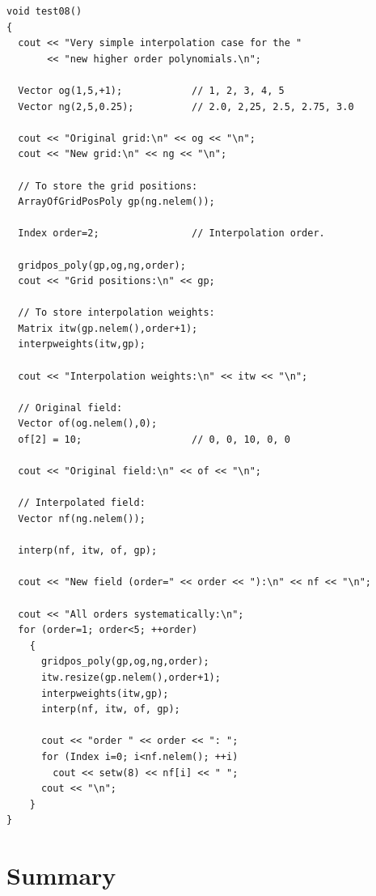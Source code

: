 \begin{lstlisting}
void test08()
{
  cout << "Very simple interpolation case for the "
       << "new higher order polynomials.\n";

  Vector og(1,5,+1);            // 1, 2, 3, 4, 5
  Vector ng(2,5,0.25);          // 2.0, 2,25, 2.5, 2.75, 3.0

  cout << "Original grid:\n" << og << "\n";
  cout << "New grid:\n" << ng << "\n";

  // To store the grid positions:
  ArrayOfGridPosPoly gp(ng.nelem());

  Index order=2;                // Interpolation order.

  gridpos_poly(gp,og,ng,order);
  cout << "Grid positions:\n" << gp;

  // To store interpolation weights:
  Matrix itw(gp.nelem(),order+1);
  interpweights(itw,gp);
    
  cout << "Interpolation weights:\n" << itw << "\n";

  // Original field:
  Vector of(og.nelem(),0);
  of[2] = 10;                   // 0, 0, 10, 0, 0

  cout << "Original field:\n" << of << "\n";

  // Interpolated field:
  Vector nf(ng.nelem());

  interp(nf, itw, of, gp);

  cout << "New field (order=" << order << "):\n" << nf << "\n";  

  cout << "All orders systematically:\n";
  for (order=1; order<5; ++order)
    {
      gridpos_poly(gp,og,ng,order);
      itw.resize(gp.nelem(),order+1);
      interpweights(itw,gp);
      interp(nf, itw, of, gp);

      cout << "order " << order << ": ";
      for (Index i=0; i<nf.nelem(); ++i)
        cout << setw(8) << nf[i] << " ";
      cout << "\n";
    }
}
\end{lstlisting}



\section{Summary}

